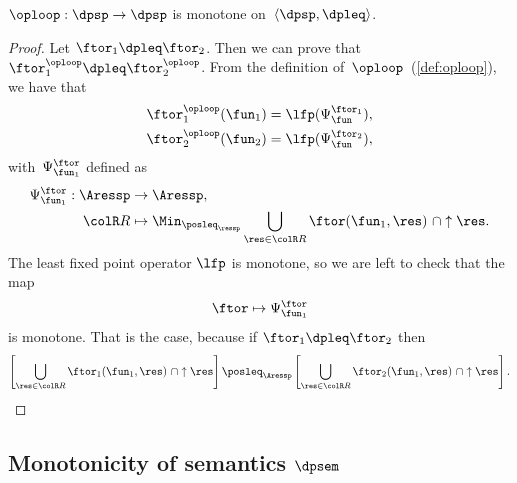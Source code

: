 \begin{lemma}
    \label{lem:loop-monotone}$\oploop:\dpsp\rightarrow\dpsp$ is monotone
    on~$\langle\dpsp,\dpleq\rangle$.
\end{lemma}
\begin{proof}
    Let $\ftor_{1}\dpleq\ftor_{2}$.
    Then we can prove that $\ftor_{1}^{\oploop}\dpleq\ftor_{2}^{\oploop}$.
    From the definition of~$\oploop$~(\cref{def:oploop}), we
    have that
    \begin{align*}
        \ftor_{1}^{\oploop}(\fun_{1}) & =\lfp(\Psi_{\fun}^{\ftor_{1}}), \\
        \ftor_{2}^{\oploop}(\fun_{2}) & =\lfp(\Psi_{\fun}^{\ftor_{2}}),
    \end{align*}
    with~$\Psi_{\fun_{1}}^{\ftor}$ defined as
    \begin{align*}
        \Psi_{\fun_{1}}^{\ftor}:\Aressp & \rightarrow\Aressp,                                                                             \\
        {\colR R}                       & \mapsto\Min_{\posleq_{\ressp}}\bigcup_{\res\in{\colR R}}\ftor(\fun_{1},\res)\ \cap\uparrow\res.
    \end{align*}
    The least fixed point operator $\lfp$ is monotone, so we are left
    to check that the map
    \[
        \ftor\mapsto\Psi_{\fun_{1}}^{\ftor}
    \]
    is monotone.
    That is the case, because if $\ftor_{1}\dpleq\ftor_{2}$
    then
    \[
        \left[\bigcup_{\res\in{\colR R}}\ftor_{1}(\fun_{1},\res)\ \cap\uparrow\res\right]\posleq_{\Aressp}\left[\bigcup_{\res\in{\colR R}}\ftor_{2}(\fun_{1},\res)\ \cap\uparrow\res\right].
    \]
\end{proof}

\subsection{Monotonicity of semantics $\dpsem$}


